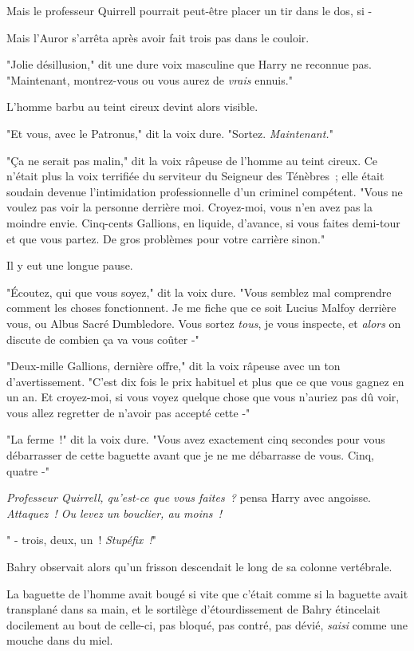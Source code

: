 Mais le professeur Quirrell pourrait peut-être placer un tir dans le dos, si -

Mais l'Auror s'arrêta après avoir fait trois pas dans le couloir.

"Jolie désillusion," dit une dure voix masculine que Harry ne reconnue pas. "Maintenant, montrez-vous ou vous aurez de \emph{vrais} ennuis."

L'homme barbu au teint cireux devint alors visible.

"Et vous, avec le Patronus," dit la voix dure. "Sortez. \emph{Maintenant.}"

"Ça ne serait pas malin," dit la voix râpeuse de l'homme au teint cireux. Ce n'était plus la voix terrifiée du serviteur du Seigneur des Ténèbres~; elle était soudain devenue l'intimidation professionnelle d'un criminel compétent. "Vous ne voulez pas voir la personne derrière moi. Croyez-moi, vous n'en avez pas la moindre envie. Cinq-cents Gallions, en liquide, d'avance, si vous faites demi-tour et que vous partez. De gros problèmes pour votre carrière sinon."

Il y eut une longue pause.

"Écoutez, qui que vous soyez," dit la voix dure. "Vous semblez mal comprendre comment les choses fonctionnent. Je me fiche que ce soit Lucius Malfoy derrière vous, ou Albus Sacré Dumbledore. Vous sortez \emph{tous}, je vous inspecte, et \emph{alors} on discute de combien ça va vous coûter -"

"Deux-mille Gallions, dernière offre," dit la voix râpeuse avec un ton d'avertissement. "C'est dix fois le prix habituel et plus que ce que vous gagnez en un an. Et croyez-moi, si vous voyez quelque chose que vous n'auriez pas dû voir, vous allez regretter de n'avoir pas accepté cette -"

"La ferme~!" dit la voix dure. "Vous avez exactement cinq secondes pour vous débarrasser de cette baguette avant que je ne me débarrasse de vous. Cinq, quatre -"

\emph{Professeur Quirrell, qu'est-ce que vous faites~?} pensa Harry avec angoisse. \emph{Attaquez~! Ou levez un bouclier, au moins~!}

" - trois, deux, un~! \emph{Stupéfix~!}"

\later

Bahry observait alors qu'un frisson descendait le long de sa colonne vertébrale.

La baguette de l'homme avait bougé si vite que c'était comme si la baguette avait transplané dans sa main, et le sortilège d'étourdissement de Bahry étincelait docilement au bout de celle-ci, pas bloqué, pas contré, pas dévié, \emph{saisi} comme une mouche dans du miel.

